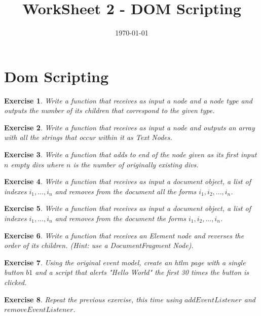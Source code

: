 \documentclass{article}
\title{WorkSheet 2 - DOM Scripting}
\date{\today}
\newtheorem{ex}{Exercise}[section]
\begin{document}
\maketitle 

\section{Dom Scripting}

\begin{ex}
Write a function that receives as input a node and a node type 
and outputs the number of its children that correspond to the given type. 
\end{ex}

\begin{ex}
Write a function that receives as input a node and outputs 
an array with all the strings that occur within it as \textit{Text Nodes}. 
\end{ex}

\begin{ex}
Write a function that adds to end of the 
node given as its first input $n$ empty divs where $n$ is the number of originally existing divs. 
\end{ex}

\begin{ex}
Write a function that receives as input a document object, 
a list of indexes $i_1, ..., i_n$ and removes from the document all the forms $i_1, i_2, ..., i_n$. 
\end{ex}

\begin{ex}
Write a function that receives as input a document object, 
a list of indexes $i_1, ..., i_n$ and removes from the document the forms $i_1, i_2, ..., i_n$. 
\end{ex}

\begin{ex}
Write a function that receives an Element node and reverses the order of its children. (Hint: 
use a DocumentFragment Node). 
\end{ex}


\begin{ex}
Using the original event model, create an htlm page with a single 
button $b1$ and a script that alerts "Hello World" the first 30 times the button is clicked. 
\end{ex}

\begin{ex}
Repeat the previous exercise, this time using $addEventListener$
and $removeEventListener$.  
\end{ex}
\end{document}
